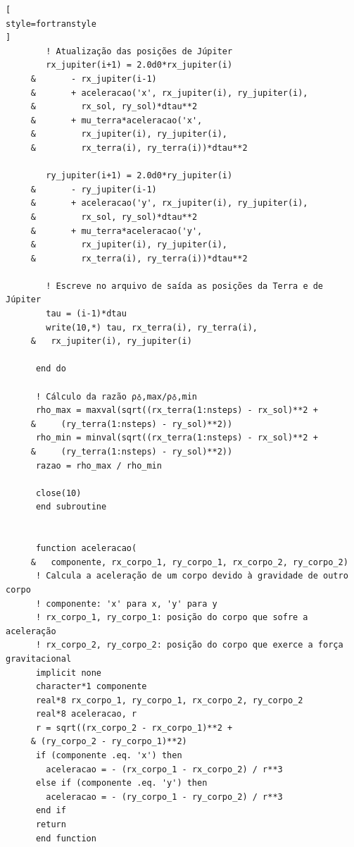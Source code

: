 \documentclass[12pt,a4paper]{article}
\begin{document}
\begin{lstlisting}[
style=fortranstyle
]
        ! Atualização das posições de Júpiter
        rx_jupiter(i+1) = 2.0d0*rx_jupiter(i)
     &       - rx_jupiter(i-1)
     &       + aceleracao('x', rx_jupiter(i), ry_jupiter(i),
     &         rx_sol, ry_sol)*dtau**2
     &       + mu_terra*aceleracao('x',
     &         rx_jupiter(i), ry_jupiter(i),
     &         rx_terra(i), ry_terra(i))*dtau**2

        ry_jupiter(i+1) = 2.0d0*ry_jupiter(i)
     &       - ry_jupiter(i-1)
     &       + aceleracao('y', rx_jupiter(i), ry_jupiter(i),
     &         rx_sol, ry_sol)*dtau**2
     &       + mu_terra*aceleracao('y',
     &         rx_jupiter(i), ry_jupiter(i),
     &         rx_terra(i), ry_terra(i))*dtau**2

        ! Escreve no arquivo de saída as posições da Terra e de Júpiter
        tau = (i-1)*dtau
        write(10,*) tau, rx_terra(i), ry_terra(i), 
     &   rx_jupiter(i), ry_jupiter(i)

      end do

      ! Cálculo da razão ρ♁,max/ρ♁,min
      rho_max = maxval(sqrt((rx_terra(1:nsteps) - rx_sol)**2 + 
     &     (ry_terra(1:nsteps) - ry_sol)**2))
      rho_min = minval(sqrt((rx_terra(1:nsteps) - rx_sol)**2 + 
     &     (ry_terra(1:nsteps) - ry_sol)**2))
      razao = rho_max / rho_min

      close(10)
      end subroutine


      function aceleracao(
     &   componente, rx_corpo_1, ry_corpo_1, rx_corpo_2, ry_corpo_2)
      ! Calcula a aceleração de um corpo devido à gravidade de outro corpo
      ! componente: 'x' para x, 'y' para y
      ! rx_corpo_1, ry_corpo_1: posição do corpo que sofre a aceleração
      ! rx_corpo_2, ry_corpo_2: posição do corpo que exerce a força gravitacional
      implicit none
      character*1 componente
      real*8 rx_corpo_1, ry_corpo_1, rx_corpo_2, ry_corpo_2
      real*8 aceleracao, r
      r = sqrt((rx_corpo_2 - rx_corpo_1)**2 + 
     & (ry_corpo_2 - ry_corpo_1)**2)
      if (componente .eq. 'x') then
        aceleracao = - (rx_corpo_1 - rx_corpo_2) / r**3
      else if (componente .eq. 'y') then
        aceleracao = - (ry_corpo_1 - ry_corpo_2) / r**3
      end if
      return
      end function
\end{lstlisting}


\end{document}
